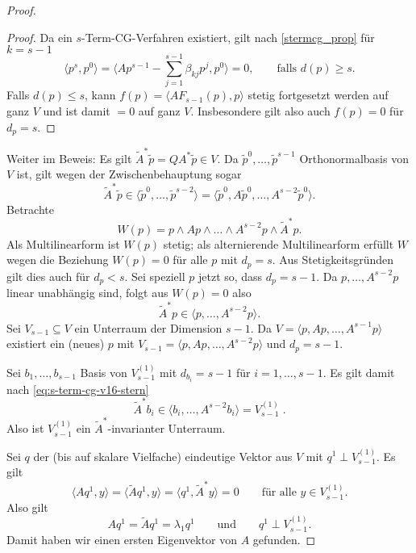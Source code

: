 \begin{proof}
\begin{proof}
  Da ein $s$-Term-CG-Verfahren existiert, gilt nach
  \eqref{stermcg_prop}
  f\"ur $k=s-1$
  \begin{equation*}
    \langle p^s,p^0\rangle
    =
    \langle Ap^{s-1}-\sum_{j=1}^{s-1}\beta_{kj}p^j,p^0\rangle
    =
    0,
    \qquad
    \text{falls } d(p)\geq s.
  \end{equation*}
  Falls $d(p)\leq s$, kann $f(p)=\langle AF_{s-1}(p),p\rangle$ stetig
  fortgesetzt werden auf ganz $V$ und ist damit $=0$ auf ganz $V$.
  Insbesondere gilt also auch $f(p)=0$ f\"ur $d_p=s$.
\end{proof}

Weiter im Beweis: Es gilt ${\tilde A}^*\tilde p = QA^*\tilde p\in V$.
Da $\tilde p^0,\dots,\tilde p^{s-1}$ Orthonormalbasis von $V$ ist, gilt
wegen der Zwischenbehauptung sogar
\begin{equation} \label{mlf_eq}
  {\tilde A}^*\tilde p \in  \langle \tilde p^0,\dots,\tilde p^{s-2}\rangle
  = \langle\tilde p^0,A\tilde p^0,\dots,A^{s-2}\tilde p^0\rangle
  .
\end{equation}
Betrachte
\begin{equation*}
  W(p)
  =
  p \wedge Ap \wedge \dots \wedge A^{s-2}p \wedge {\tilde A}^*p.
\end{equation*}
Als Multilinearform ist $W(p)$ stetig; als alternierende
Multilinearform erf\"ullt $W$ wegen  die Beziehung $W(p)=0$ f\"ur alle $p$
mit $d_p=s$.
Aus Stetigkeitsgr\"unden gilt dies auch f\"ur $d_p<s$.
Sei speziell $p$ jetzt so, dass $d_p=s-1$.
Da $p,\dots,A^{s-2}p$ linear unabh\"angig sind, folgt aus $W(p)=0$ also
\begin{equation}
  \label{eq:s-term-cg-v16-stern}
  {\tilde A}^*p \in \langle p,\dots,A^{s-2}p\rangle
  .
\end{equation}
Sei $V_{s-1}\subseteq V$ ein Unterraum der Dimension $s-1$. Da
$V=\langle p,Ap,\dots,A^{s-1}p\rangle$ existiert ein (neues) $p$ mit
$V_{s-1}=\langle p,Ap,\dots,A^{s-2}p\rangle$ und $d_p=s-1$.

Sei $b_1,\dots,b_{s-1}$ Basis von $V_{s-1}^{(1)}$ mit $d_{b_i}=s-1$ f\"ur
$i=1,\dots,s-1$. Es gilt damit nach \eqref{eq:s-term-cg-v16-stern}
\begin{equation*}
  {\tilde A}^*b_i \in \langle b_i,\dots, A^{s-2}b_i\rangle
  =
  V_{s-1}^{(1)} \;
  .
\end{equation*}
Also ist $V_{s-1}^{(1)}$ ein ${\tilde A}^*$-invarianter Unterraum.

Sei $q$ der (bis auf skalare Vielfache) eindeutige Vektor aus $V$ mit
$q^1\perp V_{s-1}^{(1)}$. Es gilt
\begin{equation*}
  \langle Aq^1,y\rangle
  =
  \langle \tilde Aq^1, y\rangle
  =
  \langle q^1, {\tilde A}^*y\rangle
  =
  0
  \qquad
  \text{f\"ur alle }y\in V_{s-1}^{(1)}
  .
\end{equation*}
Also gilt
\begin{equation*}
  Aq^1
  =
  \tilde Aq^1
  =
  \lambda_1q^1
  \qquad
  \text{und}
  \qquad
  q^1\perp V_{s-1}^{(1)}
  .
\end{equation*}
Damit haben wir einen ersten Eigenvektor von $A$ gefunden.



\end{proof}
